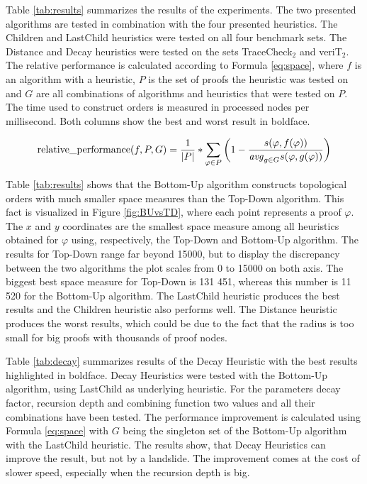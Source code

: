 Table \ref{tab:results} summarizes the results of the experiments.
The two presented algorithms are tested in combination with the four presented heuristics.
The Children and LastChild heuristics were tested on all four benchmark sets.
The Distance and Decay heuristics were tested on the sets TraceCheck$_2$ and veriT$_2$.
The relative performance is calculated according to Formula \ref{eq:space}, where $f$ is an algorithm with a heuristic, $P$ is the set of proofs the heuristic was tested on and $G$ are all combinations of algorithms and heuristics that were tested on $P$.
The time used to construct orders is measured in processed nodes per millisecond.
Both columns show the best and worst result in boldface.

\begin{align}
  \operatorname{relative\_performance}(f,P,G) = \frac{1}{|P|} * \sum_{\varphi \in P}{\left( 1 -
    \frac{
      s(\varphi,f(\varphi))
    }{
        \mathit{avg}_{g\in G}{s(\varphi,g(\varphi))}
    } \right)
  }
  \label{eq:space}
\end{align}

Table \ref{tab:results} shows that the Bottom-Up algorithm constructs topological orders with much smaller space measures than the Top-Down algorithm. 
This fact is visualized in Figure \ref{fig:BUvsTD}, where each point represents a proof $\varphi$.
The $x$ and $y$ coordinates are the smallest space measure among all heuristics obtained for $\varphi$ using, respectively, the Top-Down and Bottom-Up algorithm.
The results for Top-Down range far beyond 15000, but to display the discrepancy between the two algorithms the plot scales from 0 to 15000 on both axis.
The biggest best space measure for Top-Down is 131 451, whereas this number is 11 520 for the Bottom-Up algorithm.
The LastChild heuristic produces the best results and the Children heuristic also performs well.
The Distance heuristic produces the worst results, which could be due to the fact that the radius is too small for big proofs with thousands of proof nodes.

Table \ref{tab:decay} summarizes results of the Decay Heuristic with the best results highlighted in boldface.
Decay Heuristics were tested with the Bottom-Up algorithm, using LastChild as underlying heuristic.
For the parameters decay factor, recursion depth and combining function two values and all their combinations have been tested.
The performance improvement is calculated using Formula \ref{eq:space} with $G$ being the singleton set of the Bottom-Up algorithm with the LastChild heuristic.
The results show, that Decay Heuristics can improve the result, but not by a landslide.
The improvement comes at the cost of slower speed, especially when the recursion depth is big.

